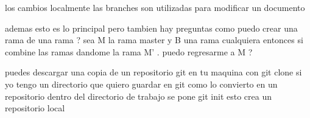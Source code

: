 \documentclass[12p]{article}
\begin{document}
los cambios localmente 
las branches son utilizadas para modificar un documento

ademas esto es lo principal pero tambien hay preguntas como
puedo crear una rama de una rama ?
sea M la rama master y B una rama cualquiera entonces si combine las
ramas dandome la rama M' . puedo regresarme a M ?

puedes descargar una copia de un repositorio git en tu maquina con
git clone
si yo tengo un directorio que quiero guardar en git como lo convierto
en un repositorio 
dentro del directorio de trabajo se pone
git init esto crea un repositorio local 
\end{document}
